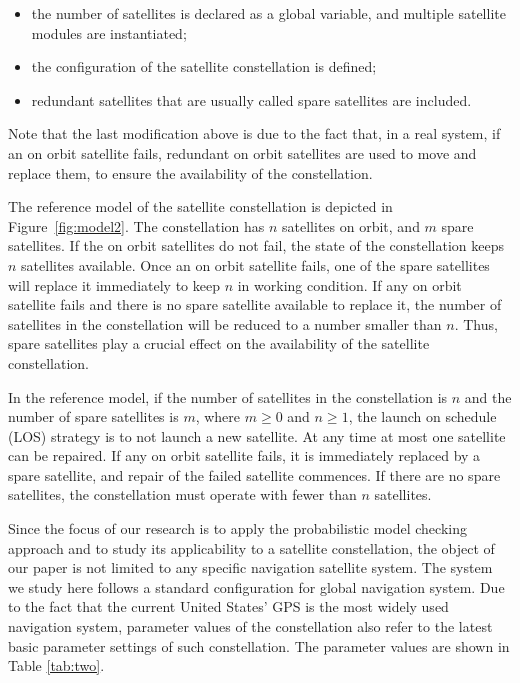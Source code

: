 \documentclass[preprint,12pt]{qrei}
\begin{document}
\begin{itemize}
\item the number of satellites is declared as a global variable, and multiple satellite modules are instantiated;
\item the configuration of the satellite constellation is defined;
\item redundant satellites that are usually called spare satellites are included.
\end{itemize}

Note that the last modification above is due to the fact that, in a real system, if an on orbit satellite fails, redundant on orbit satellites are used to move and replace them, to ensure the availability of the constellation.

The reference model of the satellite constellation is depicted in Figure~\ref{fig:model2}. The constellation has $n$ satellites on orbit, and $m$ spare satellites. If the on orbit satellites do not fail, the state of the constellation keeps $n$ satellites available. Once an on orbit satellite fails, one of the spare satellites will replace it immediately to keep $n$ in working condition. If any on orbit satellite fails and there is no spare satellite available to replace it, the number of satellites in the constellation will be reduced to a number smaller than $n$. Thus, spare satellites play a crucial effect on the availability of the satellite constellation.

In the reference model, if the number of satellites in the constellation is $n$ and the number of spare satellites is $m$, where $m\geq 0$ and $n\geq 1$, the launch on schedule (LOS) strategy is to not launch a new satellite. At any time at most one satellite can be repaired. If any on orbit satellite fails, it is immediately replaced by a spare satellite, and repair of the failed satellite commences. If there are no spare satellites, the constellation must operate with fewer than $n$ satellites.

Since the focus of our research is to apply the probabilistic model checking approach and to study its applicability to a satellite constellation, the object of our paper is not limited to any specific navigation satellite system. The system we study here follows a standard configuration for global navigation system. Due to the fact that the current United States' GPS is the most widely used navigation system, parameter values of the constellation also refer to the latest basic parameter settings of such constellation. The parameter values are shown in Table \ref{tab:two}.
\end{document}
